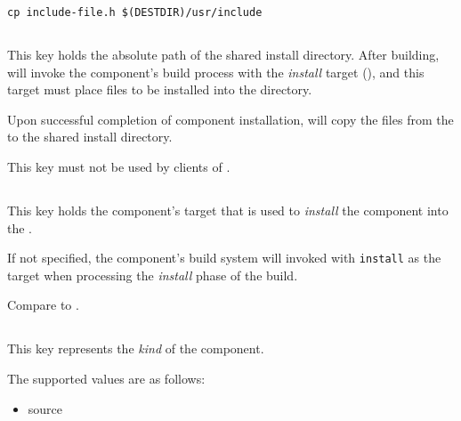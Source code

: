 \begin{verbatim}
cp include-file.h $(DESTDIR)/usr/include
\end{verbatim}


\subsection{}\label{variables:install-directory}

This key holds the absolute path of the shared install directory.
After building, \lmsbw will invoke the component's build process with
the \emph{install} target (), and this
target must place files to be installed into the \destdir directory.

Upon successful completion of component installation, \lmsbw will copy
the files from the \destdir to the shared install directory.

This key must not be used by clients of \lmsbw.


\subsection{}\label{variables:install-target}

This key holds the component's \makefile target that is used to
\emph{install} the component into the \destdir.

If not specified, the component's build system will invoked with
\texttt{install} as the target when processing the \emph{install}
phase of the build.

Compare to .


\subsection{}\label{variables:kind}

This key represents the \emph{kind} of the component.

The supported values are as follows:

\begin{itemize}
\item source
\end{itemize}

